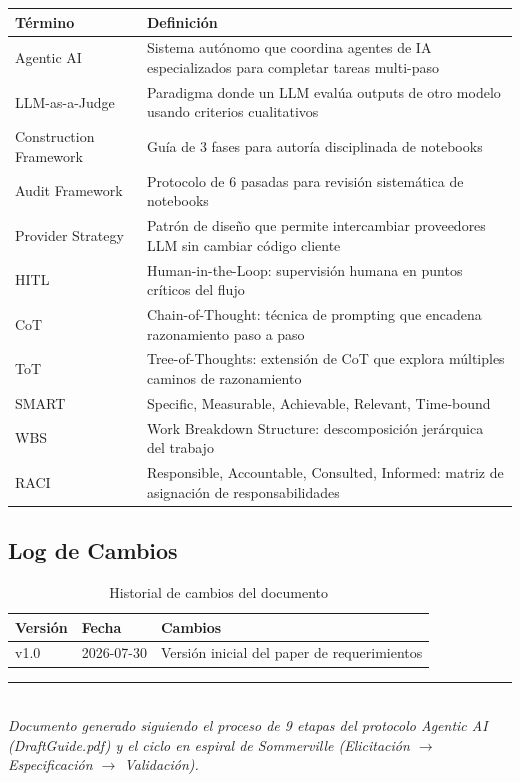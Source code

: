 \documentclass[12pt,a4paper]{article}
\begin{document}
\begin{longtable}{p{} p{}}
\toprule
\textbf{Término} & \textbf{Definición} \\
\midrule
\endhead
\bottomrule
\endfoot
Agentic AI          & Sistema autónomo que coordina agentes de IA especializados para completar tareas multi-paso \\
LLM-as-a-Judge      & Paradigma donde un LLM evalúa outputs de otro modelo usando criterios cualitativos \\
Construction Framework & Guía de 3 fases para autoría disciplinada de notebooks \\
Audit Framework     & Protocolo de 6 pasadas para revisión sistemática de notebooks \\
Provider Strategy   & Patrón de diseño que permite intercambiar proveedores LLM sin cambiar código cliente \\
HITL                & Human-in-the-Loop: supervisión humana en puntos críticos del flujo \\
CoT                 & Chain-of-Thought: técnica de prompting que encadena razonamiento paso a paso \\
ToT                 & Tree-of-Thoughts: extensión de CoT que explora múltiples caminos de razonamiento \\
SMART               & Specific, Measurable, Achievable, Relevant, Time-bound \\
WBS                 & Work Breakdown Structure: descomposición jerárquica del trabajo \\
RACI                & Responsible, Accountable, Consulted, Informed: matriz de asignación de responsabilidades \\
\bottomrule
\end{longtable}

\subsection{Log de Cambios}

\begin{table}[h]
\centering
\begin{tabular}{lll}
\toprule
\textbf{Versión} & \textbf{Fecha} & \textbf{Cambios} \\
\midrule
v1.0 & 2026-07-30 & Versión inicial del paper de requerimientos \\
\bottomrule
\end{tabular}
\caption{Historial de cambios del documento}
\end{table}

\vfill
\begin{center}
\rule{0.5\textwidth}{0.5pt}\\[4pt]
\small\textit{Documento generado siguiendo el proceso de 9 etapas del protocolo Agentic AI (DraftGuide.pdf) y el ciclo en espiral de Sommerville (Elicitación $\rightarrow$ Especificación $\rightarrow$ Validación).}
\end{center}
\end{document}
